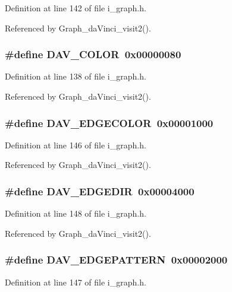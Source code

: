 Definition at line 142 of file i\_\-graph.h.

Referenced by Graph\_\-da\-Vinci\_\-visit2().
\subsubsection{\setlength{\rightskip}{0pt plus 5cm}\#define DAV\_\-COLOR~0x00000080}\label{i__graph_8h_881281546c52091356597727b50383ca}




Definition at line 138 of file i\_\-graph.h.

Referenced by Graph\_\-da\-Vinci\_\-visit2().
\subsubsection{\setlength{\rightskip}{0pt plus 5cm}\#define DAV\_\-EDGECOLOR~0x00001000}\label{i__graph_8h_8d3eb2d642a7c4a16850a3ca68273bdc}




Definition at line 146 of file i\_\-graph.h.

Referenced by Graph\_\-da\-Vinci\_\-visit2().
\subsubsection{\setlength{\rightskip}{0pt plus 5cm}\#define DAV\_\-EDGEDIR~0x00004000}\label{i__graph_8h_a1b8467d8d7520bf4dbc061c4631c622}




Definition at line 148 of file i\_\-graph.h.

Referenced by Graph\_\-da\-Vinci\_\-visit2().
\subsubsection{\setlength{\rightskip}{0pt plus 5cm}\#define DAV\_\-EDGEPATTERN~0x00002000}\label{i__graph_8h_b49a54e36a115522f97d9f829f79bbed}




Definition at line 147 of file i\_\-graph.h.

